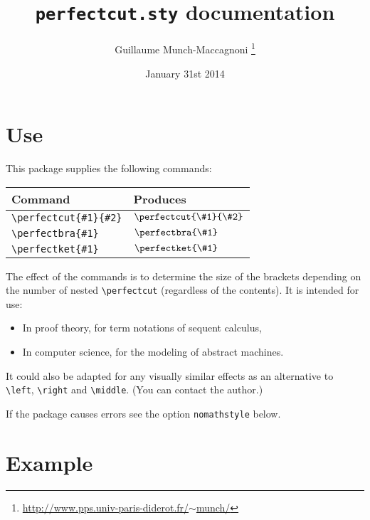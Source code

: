\documentclass[12pt,a4paper,british]{scrartcl}
\begin{document}
\title{\texttt{perfectcut.sty} documentation}
\author{Guillaume Munch-Maccagnoni%
\thanks{\protect\href{http://www.pps.univ-paris-diderot.fr/~munch/}{http://www.pps.univ-paris-diderot.fr/$\sim$munch/}%
}}
\date{January 31st 2014}
\maketitle

\section{Use}

This package supplies the following commands:

\begin{center}
\begin{tabular}{ll}
\toprule 
Command & Produces\tabularnewline
\midrule
\texttt{\textbackslash{}perfectcut\{\#1\}\{\#2\}} & $\perfectcut{\#1}{\#2}$\tabularnewline
\texttt{\textbackslash{}perfectbra\{\#1\}} & $\perfectbra{\#1}$\tabularnewline
\texttt{\textbackslash{}perfectket\{\#1\}} & $\perfectket{\#1}$\tabularnewline
\bottomrule
\end{tabular}
\end{center}

The effect of the commands is to determine the size of the brackets
depending on the number of nested \texttt{\textbackslash{}perfectcut}
(regardless of the contents). It is intended for use: 
\begin{itemize}
\item In proof theory, for term notations of sequent calculus,
\item In computer science, for the modeling of abstract machines.
\end{itemize}
It could also be adapted for any visually similar effects as an alternative
to \texttt{\textbackslash{}left}, \texttt{\textbackslash{}right} and
\texttt{\textbackslash{}middle}. (You can contact the author.)

If the package causes errors see the option \texttt{nomathstyle} below. 


\section{Example}

\def\mt{\tilde{\mu}}
\end{document}
